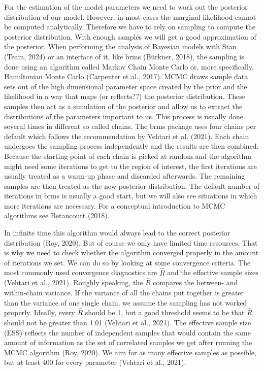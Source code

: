 \documentclass[
  doc,12pt,floatsintext]{apa7}
\begin{document}
For the estimation of the model parameters we need to work out the posterior distribution of our model. However, in most cases the marginal likelihood cannot be computed analytically. Therefore we have to rely on sampling to compute the posterior distribution. With enough samples we will get a good approximation of the posterior. When performing the analysis of Bayesian models with Stan (Team, 2024) or an interface of it, like brms (Bürkner, 2018), the sampling is done using an algorithm called Markov Chain Monte Carlo or, more specifically, Hamiltonian Monte Carlo (Carpenter et al., 2017). MCMC draws sample data sets out of the high dimensional parameter space created by the prior and the likelihood in a way that maps (or reflects??) the posterior distribution. These samples then act as a simulation of the posterior and allow us to extract the distributions of the parameters important to us. This process is usually done several times in different so called chains. The brms package uses four chains per default which follows the recommendation by Vehtari et al. (2021). Each chain undergoes the sampling process independently and the results are then combined. Because the starting point of each chain is picked at random and the algorithm might need some iterations to get to the region of interest, the first iterations are usually treated as a warm-up phase and discarded afterwards. The remaining samples are then treated as the new posterior distribution. The default number of iterations in brms is usually a good start, but we will also see situations in which more iterations are necessary. For a conceptual introduction to MCMC algorithms see Betancourt (2018).

In infinite time this algorithm would always lead to the correct posterior distribution (Roy, 2020). But of course we only have limited time resources. That is why we need to check whether the algorithm converged properly in the amount of iterations we set. We can do so by looking at some convergence criteria. The most commonly used convergence diagnostics are \(\hat{R}\) and the effective sample sizes (Vehtari et al., 2021). Roughly speaking, the \(\hat{R}\) compares the between- and within-chain variance. If the variance of all the chains put together is greater than the variance of one single chain, we assume the sampling has not worked properly. Ideally, every \(\hat{R}\) should be 1, but a good threshold seems to be that \(\hat{R}\) should not be greater than 1.01 (Vehtari et al., 2021). The effective sample size (ESS) reflects the number of independent samples that would contain the same amount of information as the set of correlated samples we get after running the MCMC algorithm (Roy, 2020). We aim for as many effective samples as possible, but at least 400 for every parameter (Vehtari et al., 2021).
\end{document}
